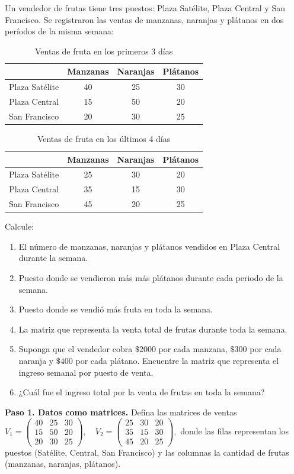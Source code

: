\begin{prob} 
Un vendedor de frutas tiene tres puestos: Plaza Satélite, Plaza Central y San Francisco. Se registraron las ventas de manzanas, naranjas y plátanos en dos períodos de la misma semana:

\begin{table}[H]\centering
\begin{tabular}{|c||c|c|c|} \hline
& Manzanas & Naranjas & Plátanos \\ \hline
Plaza Satélite & 40 & 25 & 30 \\ 
Plaza Central & 15 & 50 & 20 \\ 
San Francisco & 20 & 30 & 25 \\ \hline
\end{tabular}
\caption{Ventas de fruta en los primeros 3 días}
\end{table}

\begin{table}[H]\centering
\begin{tabular}{|c||c|c|c|} \hline
& Manzanas & Naranjas & Plátanos \\ \hline
Plaza Satélite & 25 & 30 & 20 \\ 
Plaza Central & 35 & 15 & 30 \\ 
San Francisco & 45 & 20 & 25 \\ \hline
\end{tabular}
\caption{Ventas de fruta en los últimos 4 días}
\end{table}
Calcule:
\begin{enumerate}[$(a)$]
\item El número de manzanas, naranjas y plátanos vendidos en Plaza Central durante la semana.
\item Puesto donde se vendieron más más plátanos durante cada periodo de la semana.
\item Puesto donde se vendió más fruta en toda la semana.
\item La matriz que representa la venta total de frutas durante toda la semana.
\item Suponga que el vendedor cobra $\$2000$ por cada manzana, $\$300$ por cada naranja y $\$400$ por cada plátano. Encuentre la matriz que representa el ingreso semanal por puesto de venta.
\item ¿Cuál fue el ingreso total por la venta de frutas en toda la semana?
\end{enumerate}

\begin{myproof}
\textbf{Paso 1. Datos como matrices.} Defina las matrices de ventas \(
V_1 = \begin{pmatrix}
40 & 25 & 30 \\
15 & 50 & 20 \\
20 & 30 & 25
\end{pmatrix}, \quad 
V_2 = \begin{pmatrix}
25 & 30 & 20 \\
35 & 15 & 30 \\
45 & 20 & 25
\end{pmatrix}
,\) donde las filas representan los puestos (Satélite, Central, San Francisco) y las columnas la cantidad de frutas (manzanas, naranjas, plátanos).


\end{myproof}
\end{prob}
